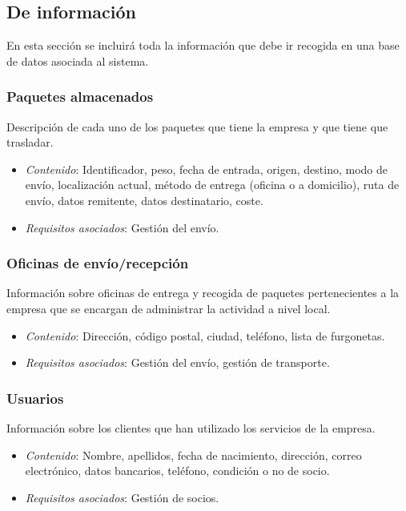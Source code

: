 \newpage

\subsection{De información}
	En esta sección se incluirá toda la información que debe ir recogida en una base de datos asociada al sistema.
\subsubsection{Paquetes almacenados}
	Descripción de cada uno de los paquetes que tiene la empresa y que tiene que trasladar. 
\begin{itemize}
	\item \textit{Contenido}: Identificador, peso, fecha de entrada, origen, destino, modo de envío, localización actual, método de entrega (oficina o a domicilio), ruta de envío, datos remitente, datos destinatario, coste.
	\item \textit{Requisitos asociados}: Gestión del envío. \\
\end{itemize}


\subsubsection{Oficinas de envío/recepción}
 	Información sobre oficinas de entrega y recogida de paquetes pertenecientes a la empresa que se encargan de administrar la actividad a nivel local.
\begin{itemize}
	\item \textit{Contenido}: Dirección, código postal, ciudad, teléfono, lista de furgonetas. 
	\item \textit{Requisitos asociados}: Gestión del envío, gestión de transporte. \\
\end{itemize}


\subsubsection{Usuarios}
	Información sobre los clientes que han utilizado los servicios de la empresa. 
\begin{itemize}
	\item \textit{Contenido}: Nombre, apellidos, fecha de nacimiento, dirección, correo electrónico, datos bancarios, teléfono, condición o no de socio.
	\item \textit{Requisitos asociados}: Gestión de socios. \\
\end{itemize}

